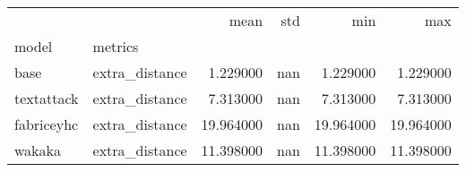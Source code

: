 \begin{tabular}{llrrrr}
 &  & mean & std & min & max \\
model & metrics &  &  &  &  \\
base & extra_distance & 1.229000 & nan & 1.229000 & 1.229000 \\
textattack & extra_distance & 7.313000 & nan & 7.313000 & 7.313000 \\
fabriceyhc & extra_distance & 19.964000 & nan & 19.964000 & 19.964000 \\
wakaka & extra_distance & 11.398000 & nan & 11.398000 & 11.398000 \\
\end{tabular}
